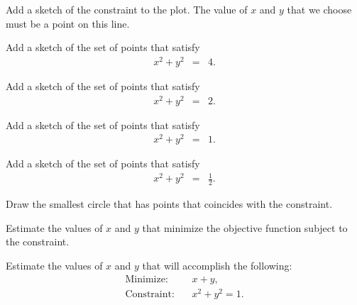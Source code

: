 \begin{problem}
  \begin{subproblem}
    \item Add a sketch of the constraint to the plot. The value of $x$
      and $y$ that we choose must be a point on this line.
    \item Add a sketch of the set of points that satisfy
      \begin{eqnarray*}
        x^2 + y^2 & = & 4.
      \end{eqnarray*}
    \item Add a sketch of the set of points that satisfy
      \begin{eqnarray*}
        x^2 + y^2 & = & 2.
      \end{eqnarray*}
    \item Add a sketch of the set of points that satisfy
      \begin{eqnarray*}
        x^2 + y^2 & = & 1.
      \end{eqnarray*}
    \item Add a sketch of the set of points that satisfy
      \begin{eqnarray*}
        x^2 + y^2 & = & \frac{1}{2}.
      \end{eqnarray*}
    \item Draw the smallest circle that has points that coincides with
      the constraint.
    \item Estimate the values of $x$ and $y$ that minimize the
      objective function subject to the constraint.
  \end{subproblem}

  \clearpage

\item Estimate the values of $x$ and $y$ that will accomplish the
  following:
  \begin{eqnarray*}
    \mathrm{Minimize:} & & x + y, \\
    \mathrm{Constraint:} & & x^2 + y^2 = 1.
  \end{eqnarray*}
  \label{optimizationMin}

  \vspace{-1em}
  \scalebox{0.55}{}


\end{problem}

